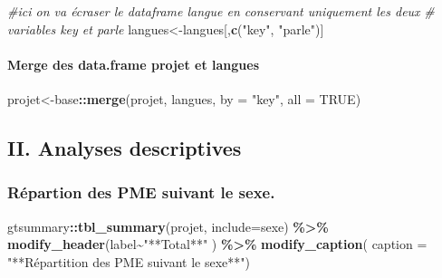 \documentclass[
]{article}
\newenvironment{Shaded}{\begin{snugshade}}{\end{snugshade}}
\newcommand{\AttributeTok}[1]{\textcolor[rgb]{0.13,0.29,0.53}{#1}}
\newcommand{\CommentTok}[1]{\textcolor[rgb]{0.56,0.35,0.01}{\textit{#1}}}
\newcommand{\ConstantTok}[1]{\textcolor[rgb]{0.56,0.35,0.01}{#1}}
\newcommand{\FunctionTok}[1]{\textcolor[rgb]{0.13,0.29,0.53}{\textbf{#1}}}
\newcommand{\NormalTok}[1]{#1}
\newcommand{\OtherTok}[1]{\textcolor[rgb]{0.56,0.35,0.01}{#1}}
\newcommand{\SpecialCharTok}[1]{\textcolor[rgb]{0.81,0.36,0.00}{\textbf{#1}}}
\newcommand{\StringTok}[1]{\textcolor[rgb]{0.31,0.60,0.02}{#1}}
\begin{document}
\begin{Shaded}
\begin{Highlighting}[]
\CommentTok{\#ici on va écraser le dataframe langue en conservant uniquement les deux}
\CommentTok{\# variables key et parle}
\NormalTok{langues}\OtherTok{\textless{}{-}}\NormalTok{langues[,}\FunctionTok{c}\NormalTok{(}\StringTok{"key"}\NormalTok{, }\StringTok{"parle"}\NormalTok{)]}
\end{Highlighting}
\end{Shaded}

\hypertarget{merge-des-data.frame-projet-et-langues}{%
\paragraph{\texorpdfstring{Merge des \textbf{data.frame} \textbf{projet}
et
\textbf{langues}}{Merge des data.frame projet et langues}}\label{merge-des-data.frame-projet-et-langues}}

\begin{Shaded}
\begin{Highlighting}[]
\NormalTok{projet}\OtherTok{\textless{}{-}}\NormalTok{base}\SpecialCharTok{::}\FunctionTok{merge}\NormalTok{(projet, langues, }\AttributeTok{by =} \StringTok{"key"}\NormalTok{, }\AttributeTok{all =} \ConstantTok{TRUE}\NormalTok{)}
\end{Highlighting}
\end{Shaded}

\hypertarget{ii.-analyses-descriptives}{%
\subsection{II. Analyses descriptives}\label{ii.-analyses-descriptives}}

\hypertarget{ruxe9partion-des-pme-suivant-le-sexe.}{%
\subsubsection{Répartion des PME suivant le
sexe.}\label{ruxe9partion-des-pme-suivant-le-sexe.}}

\begin{Shaded}
\begin{Highlighting}[]
\NormalTok{gtsummary}\SpecialCharTok{::}\FunctionTok{tbl\_summary}\NormalTok{(projet, }\AttributeTok{include=}\NormalTok{sexe) }\SpecialCharTok{\%\textgreater{}\%} \FunctionTok{modify\_header}\NormalTok{(label}\SpecialCharTok{\textasciitilde{}}\StringTok{"**Total**"}
\NormalTok{                                                    ) }\SpecialCharTok{\%\textgreater{}\%} \FunctionTok{modify\_caption}\NormalTok{(}
                                                      \AttributeTok{caption =} \StringTok{"**Répartition des PME suivant le sexe**"}\NormalTok{)}
\end{Highlighting}
\end{Shaded}
\end{document}
